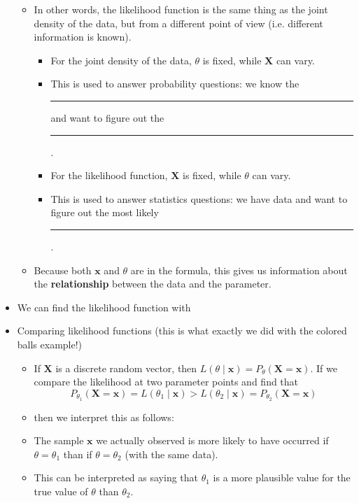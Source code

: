 \documentclass{article}
\newcommand{\blankul}[1]{\rule[-1.5mm]{#1}{0.15mm}}	%
\begin{document}
\begin{itemize}
\begin{itemize}
        \item[] In other words, the likelihood function is the same thing as the joint density of the data, but from a different point of view (i.e. different information is known).
        \begin{itemize}
            \item For the joint density of the data, $\theta$ is fixed, while $\boldsymbol{X}$ can vary.
            \item[] This is used to answer probability questions: we know the \blankul{2.5cm} and want to figure out the \blankul{2cm}.
            \item For the likelihood function, $\mathbf{X}$ is fixed, while $\theta$ can vary.
            \item[] This is used to answer statistics questions: we have data and want to figure out the most likely \blankul{4cm}.
        \end{itemize}    
        \item Because both $\mathbf{x}$ and $\theta$ are in the formula, this gives us information about the \textbf{relationship} between the data and the parameter.
    \end{itemize}
    \item We can find the likelihood function with \vspace{20pt}
    \item Comparing likelihood functions (this is what exactly we did with the colored balls example!)
    \begin{itemize}
        \item If $\mathbf{X}$ is a discrete random vector, then $L(\theta \mid \mathbf{x}) = P_{\theta}(\mathbf{X} = \mathbf{x})$. If we compare the likelihood at two parameter points and find that
        \[P_{\theta_1}(\mathbf{X} = \mathbf{x}) = L(\theta_1 \mid \boldsymbol{x}) > L(\theta_2 \mid \mathbf{x}) = P_{\theta_2}(\boldsymbol{X} = \boldsymbol{x})\]\smallskip
        \item[] then we interpret this as follows:
        \item The sample $\mathbf{x}$ we actually observed is more likely to have occurred if $\theta = \theta_1$ than if $\theta = \theta_2$ (with the same data).
        \item[] This can be interpreted as saying that $\theta_1$ is a more plausible value for the true value of $\theta$ than $\theta_2$.
    \end{itemize}
\end{itemize}\bigskip\newpage
\end{document}
